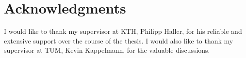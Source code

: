 \section*{Acknowledgments}
I would like to thank my supervisor at KTH, Philipp Haller, for his reliable and extensive support over the course of the thesis. I would also like to thank my supervisor at TUM, Kevin Kappelmann, for the valuable discussions.

\acknowlegmentssignature

\renewcommand{\chaptermark}[1]{ \markboth{#1}{}} 
\tableofcontents
  \markboth{\contentsname}{}

\cleardoublepage
\listoffigures

\cleardoublepage



\ifnomenclature
    \cleardoublepage
    \printnomenclature
\fi

\label{pg:lastPageofPreface}
